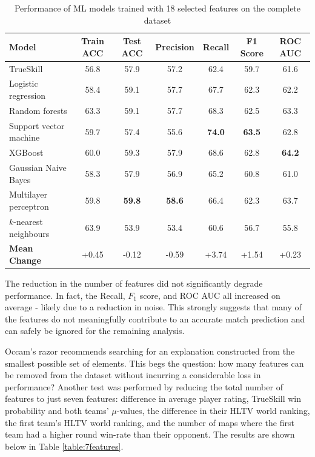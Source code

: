 \begin{table}[h!]
	\centering
	\small
	\begin{adjustbox}{center} %
		\begin{tabular}{ |l|c|c|c|c|c|c| }
			\hline
			\rule{0pt}{2.6ex} \textbf{Model} & \textbf{Train ACC} & \textbf{Test ACC} & \textbf{Precision} & \textbf{Recall} & \textbf{F1 Score} & \textbf{ROC AUC} \\
			\hline
			\rule{0pt}{2.6ex} TrueSkill                 & 56.8 & 57.9 & 57.2 & 62.4 & 59.7 & 61.6 \\ \hline
			\rule{0pt}{2.6ex} Logistic regression 		& 58.4 & 59.1 & 57.7 & 67.7 & 62.3 & 62.2 \\
			\rule{0pt}{2.6ex} Random forests 			& 63.3 & 59.1 & 57.7 & 68.3 & 62.5 & 63.3 \\
			\rule{0pt}{2.6ex} Support vector machine 	& 59.7 & 57.4 & 55.6 & \textbf{74.0} & \textbf{63.5} & 62.8 \\
			\rule{0pt}{2.6ex} XGBoost 					& 60.0 & 59.3 & 57.9 & 68.6 & 62.8 & \textbf{64.2} \\
			\rule{0pt}{2.6ex} Gaussian Naive Bayes 		& 58.3 & 57.9 & 56.9 & 65.2 & 60.8 & 61.0 \\
			\rule{0pt}{2.6ex} Multilayer perceptron     & 59.8 & \textbf{59.8} & \textbf{58.6} & 66.4 & 62.3 & 63.7 \\
			\rule{0pt}{2.6ex} $k$-nearest neighbours 	& 63.9 & 53.9 & 53.4 & 60.6 & 56.7 & 55.8 \\
			\hline
			\rule{0pt}{2.6ex} \textbf{Mean Change} 		& +0.45 & -0.12 & -0.59 & +3.74 & +1.54 & +0.23 \\
			\hline
		\end{tabular}
	\end{adjustbox}
	\caption{Performance of ML models trained with 18 selected features on the complete dataset}
	\label{table:2}
\end{table}


The reduction in the number of features did not significantly degrade performance. In fact, the Recall, $F_1$ score, and ROC AUC all increased on average - likely due to a reduction in noise. This strongly suggests that many of the features do not meaningfully contribute to an accurate match prediction and can safely be ignored for the remaining analysis.

Occam's razor recommends searching for an explanation constructed from the smallest possible set of elements. This begs the question: how many features can be removed from the dataset without incurring a considerable loss in performance? Another test was performed by reducing the total number of features to just seven features: difference in average player rating, TrueSkill win probability and both teams' $\mu$-values, the difference in their HLTV world ranking, the first team's HLTV world ranking, and the number of maps where the first team had a higher round win-rate than their opponent. The results are shown below in Table \ref{table:7features}.


